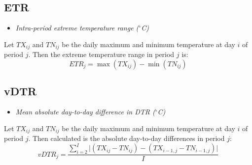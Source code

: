 \documentclass[a4paper,11pt]{article}
\begin{document}
\subsection*{ETR}
\begin{itemize}
\item \textit{Intra-period extreme temperature range ($^\circ$C)}
\end{itemize}
Let $TX_{ij}$ and $TN_{ij}$ be the daily maximum and minimum
temperature at day $i$ of period $j$. Then the extreme temperature
range in period $j$ is:
\begin{equation*}
ETR_{j} = \max{(TX_{ij})} - \min{(TN_{ij})}
\end{equation*}

\subsection*{vDTR}
\begin{itemize}
\item \textit{Mean absolute day-to-day difference in DTR ($^\circ$C)}
\end{itemize}
Let $TX_{ij}$ and $TN_{ij}$ be the daily maximum and minimum
temperature at day $i$ of period $j$. Then calculated is the absolute
day-to-day differences in period $j$:
\begin{equation*}
vDTR_{j} = \frac{\sum_{i=2}^{I} \vert (TX_{ij} -
TN_{ij})-(TX_{i-1,j} - TN_{i-1,j}) \vert }{I}
\end{equation*}



\end{document}
